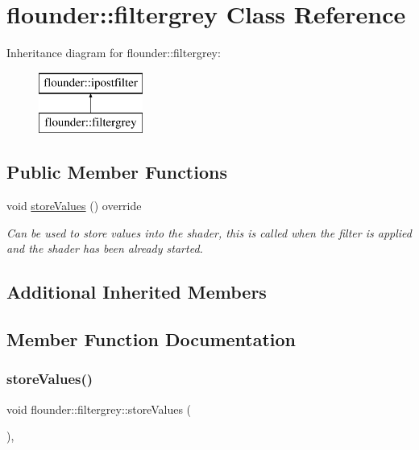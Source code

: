 \hypertarget{classflounder_1_1filtergrey}{}\section{flounder\+:\+:filtergrey Class Reference}
\label{classflounder_1_1filtergrey}
Inheritance diagram for flounder\+:\+:filtergrey\+:\begin{figure}[H]
\begin{center}
\leavevmode
\includegraphics[height=2.000000cm]{classflounder_1_1filtergrey}
\end{center}
\end{figure}
\subsection*{Public Member Functions}
\begin{DoxyCompactItemize}
\item 
void \hyperlink{classflounder_1_1filtergrey_a927f448820b39299eb04c947ffdce671}{store\+Values} () override
\begin{DoxyCompactList}\small\item\em Can be used to store values into the shader, this is called when the filter is applied and the shader has been already started. \end{DoxyCompactList}\end{DoxyCompactItemize}
\subsection*{Additional Inherited Members}


\subsection{Member Function Documentation}
\mbox{\label{classflounder_1_1filtergrey_a927f448820b39299eb04c947ffdce671}} 
\subsubsection{\texorpdfstring{store\+Values()}{storeValues()}}
{\footnotesize\ttfamily void flounder\+::filtergrey\+::store\+Values (\begin{DoxyParamCaption}{ }\end{DoxyParamCaption})\hspace{0.3cm}{\ttfamily [override]}, {\ttfamily [virtual]}}




